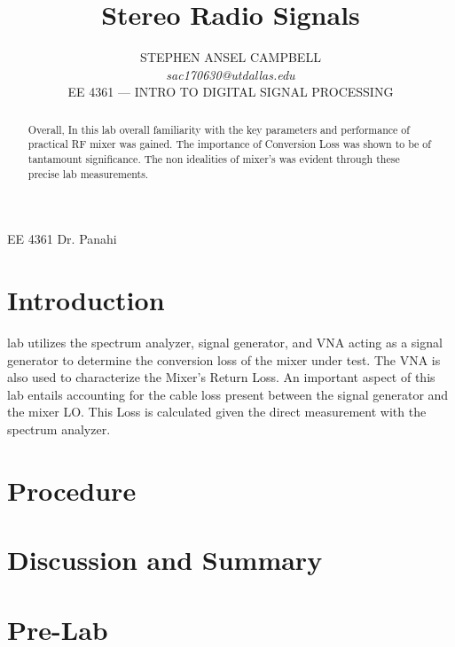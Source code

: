 \documentclass[journal]{IEEEtran}
\begin{document}
\title{Stereo Radio Signals}

\author{STEPHEN ANSEL CAMPBELL \\
    \emph{sac170630@utdallas.edu} \\
    EE 4361 --- INTRO TO DIGITAL SIGNAL PROCESSING
}

{EE 4361 Dr. Panahi}

\maketitle

\begin{abstract}
    Overall, In this lab  overall familiarity with the key parameters and
    performance of practical RF mixer was gained. The importance of Conversion Loss
    was shown to be of tantamount significance. The non idealities of mixer's was
    evident through these precise lab measurements.
\end{abstract}

\section{Introduction}

 lab utilizes the spectrum analyzer, signal generator, and VNA acting as a
signal generator to determine the conversion loss of the mixer under test. The
VNA is also used to characterize the Mixer's Return Loss. An important aspect of
this lab entails accounting for the cable loss present between the signal
generator and the mixer LO. This Loss is calculated given the direct measurement
with the spectrum analyzer.

\section{Procedure}
\section{Discussion and Summary}

\appendices
\section{Pre-Lab}
\end{document}
